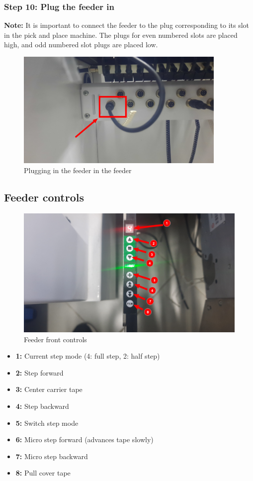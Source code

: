 \documentclass[a4paper,10pt]{report}
\begin{document}
\subsubsection{Step 10: Plug the feeder in}
\textbf{Note: } It is important to connect the feeder to the plug corresponding to its slot in the pick and place machine. The plugs for even numbered slots are placed high, and odd numbered slot plugs are placed low.
\begin{figure}[!htb]
 \centering
 \includegraphics[width=0.9\textwidth]{step10.png}
 \caption{Plugging in the feeder in the feeder}
\end{figure}
\newpage
\subsection{Feeder controls}
\begin{figure}[!htb]
 \centering
 \includegraphics[width=1\textwidth]{controls.png}
 \caption{Feeder front controls}
\end{figure}
\begin{itemize}
 \item \textbf{1: } Current step mode (4: full step, 2: half step)
 \item \textbf{2: } Step forward
 \item \textbf{3: } Center carrier tape
 \item \textbf{4: } Step backward
 \item \textbf{5: } Switch step mode
 \item \textbf{6: } Micro step forward (advances tape slowly)
 \item \textbf{7: } Micro step backward
 \item \textbf{8: } Pull cover tape
\end{itemize}
\newpage
\end{document}
